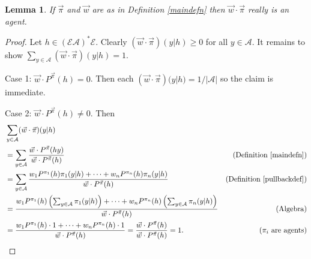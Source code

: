 \documentclass[twoside]{article}
\newtheorem{lemma}[theorem]{Lemma}
\begin{document}
\begin{lemma}
    If $\vec\pi$ and $\vec w$ are as in Definition \ref{maindefn}
    then $\vec w\cdot\vec\pi$ really is an agent.
\end{lemma}

\begin{proof}
    Let $h\in(\mathcal E\mathcal A)^*\mathcal E$.
    Clearly $(\vec w\cdot\vec\pi)(y|h)\geq 0$ for all $y\in\mathcal A$.
    It remains to show
    $\sum_{y\in\mathcal A}(\vec w\cdot\vec\pi)(y|h)=1$.

    Case 1: $\vec w\cdot {P^{\vec\pi}}(h)=0$. Then
    each $(\vec w\cdot\vec\pi)(y|h)=1/|\mathcal A|$ so the
    claim is immediate.

    Case 2: $\vec w\cdot {P^{\vec\pi}}(h)\not=0$. Then
    \begin{align*}
        &{} \sum_{y\in\mathcal A}(\vec w\cdot\vec\pi)(y|h)\\
            &= \sum_{y\in\mathcal A}
                \frac{\vec w\cdot {P^{\vec\pi}}(hy)}{\vec w\cdot {P^{\vec\pi}}(h)}
                &\mbox{(Definition \ref{maindefn})}\\
            &= \sum_{y\in\mathcal A}
                \frac
                {w_1 P^{\pi_1}(h)\pi_1(y|h)+\cdots+w_n P^{\pi_n}(h)\pi_n(y|h)}
                {\vec w\cdot {P^{\vec\pi}}(h)}
                &\mbox{(Definition \ref{pullbackdef})}\\
            &= \frac{
                w_1 P^{\pi_1}(h)\left(\mbox{$\sum_{y\in\mathcal A}\pi_1(y|h)$}\right)
                +\cdots+
                w_n P^{\pi_n}(h)\left(\mbox{$\sum_{y\in\mathcal A}\pi_n(y|h)$}\right)
                }
                {\vec w\cdot {P^{\vec\pi}}(h)}
                &\mbox{(Algebra)}\\
            &= \frac
                {w_1 P^{\pi_1}(h)\cdot 1 + \cdots + w_n P^{\pi_n}(h)\cdot1}
                {\vec w\cdot {P^{\vec\pi}}(h)}
                =\frac{\vec w\cdot {P^{\vec\pi}}(h)}{\vec w\cdot {P^{\vec\pi}}(h)}=1.
                &\mbox{($\pi_i$ are agents)}
    \end{align*}
\end{proof}
\end{document}

